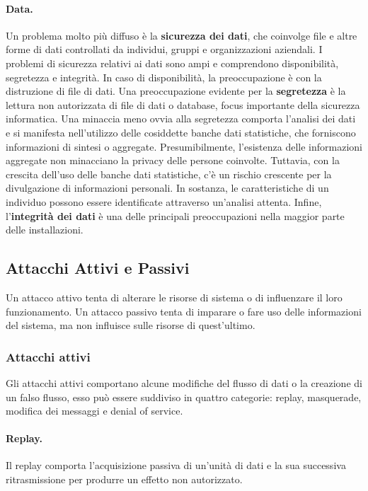\paragraph{Data.}
Un  problema molto più diffuso è la \textbf{sicurezza dei dati}, che
coinvolge file e
altre forme di dati controllati da individui, gruppi e organizzazioni aziendali.
I problemi di sicurezza relativi ai dati sono ampi e comprendono disponibilità,
segretezza e integrità. In caso di disponibilità, la preoccupazione è con la
distruzione di file di dati.
Una preoccupazione evidente per la \textbf{segretezza} è la lettura
non autorizzata di
file di dati o database, focus importante della sicurezza informatica.
Una minaccia meno ovvia alla segretezza comporta l'analisi dei dati e si
manifesta nell'utilizzo delle cosiddette banche dati statistiche, che forniscono
informazioni di sintesi o aggregate. Presumibilmente, l'esistenza delle
informazioni aggregate non minacciano la privacy delle persone coinvolte.
Tuttavia, con la crescita dell'uso delle banche dati statistiche, c'è un rischio
crescente per la divulgazione di informazioni personali. In sostanza, le
caratteristiche di un individuo possono essere identificate attraverso un'analisi
attenta.
Infine, l'\textbf{integrità dei dati} è una delle principali preoccupazioni
nella maggior parte delle installazioni.

\subsection{Attacchi Attivi e Passivi}

Un attacco attivo tenta di alterare le risorse di sistema o di influenzare il
loro funzionamento.
Un attacco passivo tenta di imparare o fare
uso delle informazioni del sistema, ma non influisce sulle risorse di quest'ultimo.

\subsubsection{Attacchi attivi}

Gli attacchi attivi comportano alcune modifiche del flusso di dati o la creazione
di un falso flusso, esso può essere suddiviso in quattro categorie: replay,
masquerade, modifica dei messaggi e denial of service.

\paragraph{Replay.}
Il replay comporta l'acquisizione passiva di un'unità di dati e la sua successiva
ritrasmissione per produrre un effetto non autorizzato.

